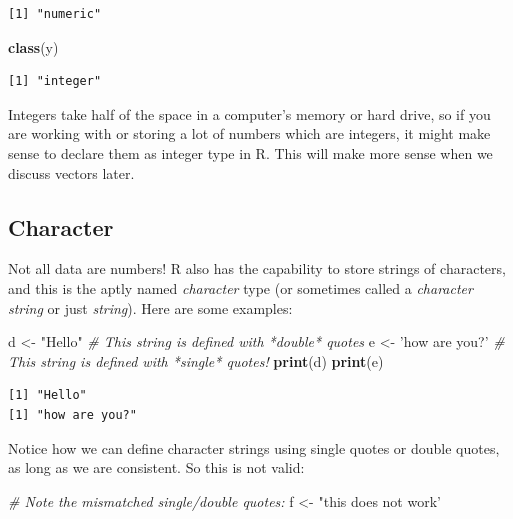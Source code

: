 \documentclass[
]{book}
\newenvironment{Shaded}{\begin{snugshade}}{\end{snugshade}}
\newcommand{\CommentTok}[1]{\textcolor[rgb]{0.56,0.35,0.01}{\textit{#1}}}
\newcommand{\KeywordTok}[1]{\textcolor[rgb]{0.13,0.29,0.53}{\textbf{#1}}}
\newcommand{\NormalTok}[1]{#1}
\newcommand{\StringTok}[1]{\textcolor[rgb]{0.31,0.60,0.02}{#1}}
\begin{document}
\begin{verbatim}
[1] "numeric"
\end{verbatim}

\begin{Shaded}
\begin{Highlighting}[]
\KeywordTok{class}\NormalTok{(y)}
\end{Highlighting}
\end{Shaded}

\begin{verbatim}
[1] "integer"
\end{verbatim}

Integers take half of the space in a computer's memory or hard drive, so if you are working with or storing a lot of numbers which are integers, it might make sense to declare them as integer type in R.
This will make more sense when we discuss vectors later.

\hypertarget{character}{%
\subsection{Character}\label{character}}

Not all data are numbers!
R also has the capability to store strings of characters, and this is the aptly named \emph{character} type (or sometimes called a \emph{character string} or just \emph{string}).
Here are some examples:

\begin{Shaded}
\begin{Highlighting}[]
\NormalTok{d <-}\StringTok{ "Hello"}         \CommentTok{# This string is defined with   *double*   quotes }
\NormalTok{e <-}\StringTok{ 'how are you?'}  \CommentTok{# This string is defined with   *single*   quotes!}
\KeywordTok{print}\NormalTok{(d)}
\KeywordTok{print}\NormalTok{(e)}
\end{Highlighting}
\end{Shaded}

\begin{verbatim}
[1] "Hello"
[1] "how are you?"
\end{verbatim}

Notice how we can define character strings using single quotes or double quotes, as long as we are consistent.
So this is not valid:

\begin{Shaded}
\begin{Highlighting}[]
\CommentTok{# Note the mismatched single/double quotes:}
\NormalTok{f <-}\StringTok{ "this does not work' }
\end{Highlighting}
\end{Shaded}
\end{document}
